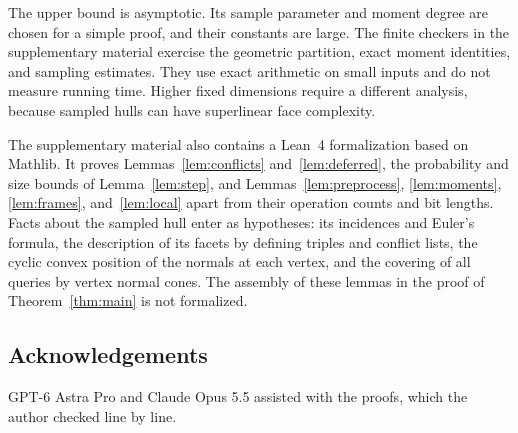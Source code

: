 \documentclass[notab,a4paper,UKenglish,numberwithinsect]{socg-lipics-v2021}
\begin{document}
The upper bound is asymptotic. Its sample parameter and moment degree are chosen for a simple proof, and their constants are large. The finite checkers in the supplementary material exercise the geometric partition, exact moment identities, and sampling estimates. They use exact arithmetic on small inputs and do not measure running time. Higher fixed dimensions require a different analysis, because sampled hulls can have superlinear face complexity.

The supplementary material also contains a Lean~4 formalization based on Mathlib. It proves Lemmas~\ref{lem:conflicts} and~\ref{lem:deferred}, the probability and size bounds of Lemma~\ref{lem:step}, and Lemmas~\ref{lem:preprocess}, \ref{lem:moments}, \ref{lem:frames}, and~\ref{lem:local} apart from their operation counts and bit lengths. Facts about the sampled hull enter as hypotheses: its incidences and Euler's formula, the description of its facets by defining triples and conflict lists, the cyclic convex position of the normals at each vertex, and the covering of all queries by vertex normal cones. The assembly of these lemmas in the proof of Theorem~\ref{thm:main} is not formalized.

\subsection*{Acknowledgements}
GPT-6 Astra Pro and Claude Opus 5.5 assisted with the proofs, which the author checked line by line.



\clearpage
\appendix
\end{document}
